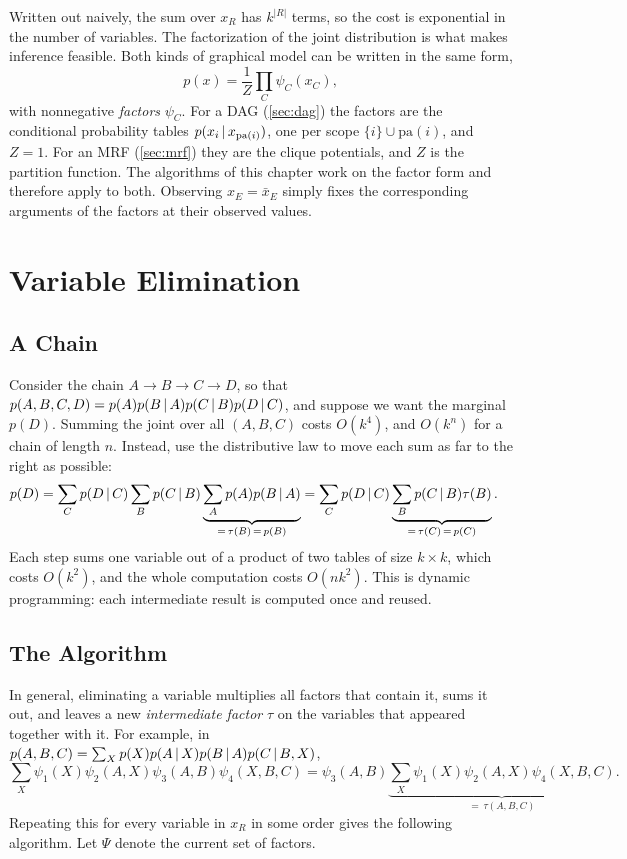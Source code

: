 Written out naively, the sum over $x_R$ has $k^{|R|}$ terms, so the cost is exponential in the number of variables. The factorization of the joint distribution is what makes inference feasible. Both kinds of graphical model can be written in the same form,
\begin{equation}\label{eq:factor-form}
p(x)=\frac1Z\prod_{C}\psi_C(x_C),
\end{equation}
with nonnegative \emph{factors} $\psi_C$. For a DAG (\cref{sec:dag}) the factors are the conditional probability tables $p(x_i\,|\, x_{\mathrm{pa}(i)})$, one per scope $\{i\}\cup\mathrm{pa}(i)$, and $Z=1$. For an MRF (\cref{sec:mrf}) they are the clique potentials, and $Z$ is the partition function. The algorithms of this chapter work on the factor form and therefore apply to both. Observing $x_E=\bar x_E$ simply fixes the corresponding arguments of the factors at their observed values.

\section{Variable Elimination}\label{sec:ve}

\subsection{A Chain}

Consider the chain $A\to B\to C\to D$, so that $p(A,B,C,D)=p(A)p(B\,|\, A)p(C\,|\, B)p(D\,|\, C)$, and suppose we want the marginal $p(D)$. Summing the joint over all $(A,B,C)$ costs $O(k^4)$, and $O(k^n)$ for a chain of length $n$. Instead, use the distributive law to move each sum as far to the right as possible:
\begin{align*}
p(D)&=\sum_C p(D\,|\, C)\sum_B p(C\,|\, B)\underbrace{\sum_A p(A)p(B\,|\, A)}_{=\,\tau(B)\,=\,p(B)}
=\sum_C p(D\,|\, C)\underbrace{\sum_B p(C\,|\, B)\tau(B)}_{=\,\tau(C)\,=\,p(C)}.
\end{align*}
Each step sums one variable out of a product of two tables of size $k\times k$, which costs $O(k^2)$, and the whole computation costs $O(nk^2)$. This is dynamic programming: each intermediate result is computed once and reused.

\subsection{The Algorithm}

In general, eliminating a variable multiplies all factors that contain it, sums it out, and leaves a new \emph{intermediate factor} $\tau$ on the variables that appeared together with it. For example, in $p(A,B,C)=\sum_X p(X)p(A\,|\, X)p(B\,|\, A)p(C\,|\, B,X)$,
\[
\sum_X\psi_1(X)\psi_2(A,X)\psi_3(A,B)\psi_4(X,B,C)=\psi_3(A,B)\underbrace{\sum_X\psi_1(X)\psi_2(A,X)\psi_4(X,B,C)}_{=\,\tau(A,B,C)}.
\]
Repeating this for every variable in $x_R$ in some order gives the following algorithm. Let $\Psi$ denote the current set of factors.

